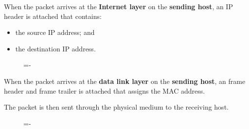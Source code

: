 \documentclass[a4paper]{systems-software}
\begin{document}
When the packet arrives at the \textbf{Internet layer} on the \textbf{sending host}, an IP header is attached that contains:
\begin{itemize}
	\item the source IP address; and
	\item the destination IP address.
\end{itemize}

\begin{figure}[H]
	\lineskip=-\fboxrule
\end{figure}

When the packet arrives at the \textbf{data link layer} on the \textbf{sending host}, an frame header and frame trailer is attached that assigns the MAC address.

The packet is then sent through the physical medium to the receiving host.

\begin{figure}[H]
	\lineskip=-\fboxrule
\end{figure}
\end{document}
